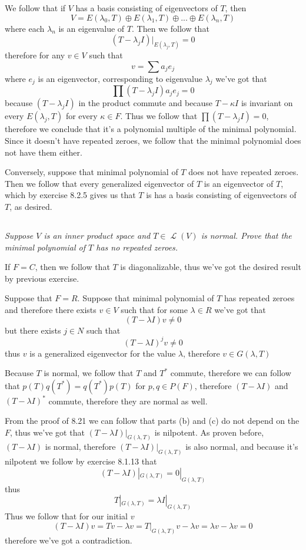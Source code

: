 \documentclass[11pt,oneside,titlepage]{book}
\DeclareMathOperator \map {\mathcal {L}}
\begin{document}
We follow that if $V$ has a basis consisting of eigenvectors of $T$, then
$$V = E(\lambda_0, T) \oplus E(\lambda_1, T) \oplus ... \oplus E(\lambda_n, T)$$
where each $\lambda_n$ is an eigenvalue of $T$.  Then we follow that
$$(T - \lambda_jI )|_{E(\lambda_j, T)} = 0$$
therefore for any $v \in V$ such that
$$v = \sum a_j e_j$$
where $e_j$ is an eigenvector, corresponding to eigenvalue $\lambda_j$ we've got
that
$$\prod{(T - \lambda_jI )} a_j e_j  = 0$$
because $(T - \lambda_j I)$ in the product commute and because $T - \kappa I$ is invariant
on every $E(\lambda_j, T)$ for every $\kappa \in F$. Thus we follow that
$\prod{(T - \lambda_jI )} = 0$, therefore we conclude that it's a polynomial multiple of the
minimal polynomial. Since it doesn't have repeated zeroes, we follow that the minimal polynomial
does not have them either.

Conversely, suppose that minimal polynomial of $T$ does not have repeated zeroes.
Then we follow that every generalized eigenvector of $T$ is an eigenvector of $T$,
which by exercise 8.2.5 gives us that $T$ is has a basis consisting of eigenvectors
of $T$, as desired.

\subsection{}

\textit{Suppose $V$ is an inner product space and $T \in \map(V)$ is normal. Prove that
  the minimal polynomial of $T$ has no repeated zeroes.}

If $F = C$, then we follow that $T$ is diagonalizable, thus we've got the desired result
by previous exercise.

Suppose that $F = R$. Suppose that minimal polynomial of $T$ has repeated zeroes and therefore
there exists $v \in V$ such that for some $\lambda \in R$ we've got that 
$$(T - \lambda I) v \neq 0$$
but there exists $j \in N$ such that
$$(T - \lambda I)^j v \neq 0$$
thus $v$ is a generalized eigenvector for the value $\lambda$, therefore $v \in G(\lambda, T)$

Because $T$ is normal, we follow that $T$ and $T^*$ commute, therefore we can follow that
$p(T)q(T^*) = q(T^*)p(T)$ for $p, q \in P(F)$, therefore $(T - \lambda I)$ and $(T - \lambda I)^*$
commute, therefore they are normal as well.

From the proof of 8.21 we can follow that parts (b) and (c) do not depend on the
$F$, thus we've got that $(T - \lambda I)|_{G(\lambda, T)}$ is nilpotent. As proven before,
$(T - \lambda I)$ is normal, therefore $(T - \lambda I)|_{G(\lambda, T)}$ is also normal,
and because it's nilpotent we follow by exercise 8.1.13 that
$$(T - \lambda I)|_{G(\lambda, T)} = 0|_{G(\lambda, T)}$$
thus
$$T|_{G(\lambda, T)} = \lambda I|_{G(\lambda, T)}$$
Thus we follow that for our initial $v$
$$(T - \lambda I)v = Tv - \lambda v = T|_{G(\lambda, T)}v - \lambda v =
\lambda v - \lambda v = 0$$
therefore we've got a contradiction.
\end{document}
